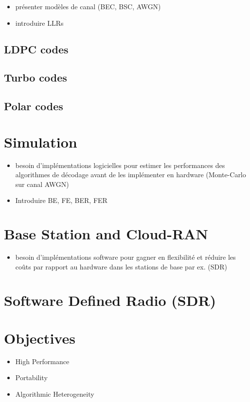 \begin{itemize}
  \item présenter modèles de canal (BEC, BSC, AWGN)
  \item introduire LLRs
\end{itemize}

\subsection{LDPC codes}

\subsection{Turbo codes}

\subsection{Polar codes}

\section{Simulation}

\begin{itemize}
  \item besoin d'implémentations logicielles pour estimer les performances des
    algorithmes de décodage avant de les implémenter en hardware (Monte-Carlo
    sur canal AWGN)
  \item Introduire BE, FE, BER, FER
\end{itemize}

\section{Base Station and Cloud-RAN}

\begin{itemize}
  \item besoin d'implémentations software pour gagner en flexibilité et réduire
    les coûts par rapport au hardware dans les stations de base par ex. (SDR)
\end{itemize}

\section{Software Defined Radio (SDR)}

\section{Objectives}

\begin{itemize}
  \item High Performance
  \item Portability
  \item Algorithmic Heterogeneity
\end{itemize}
